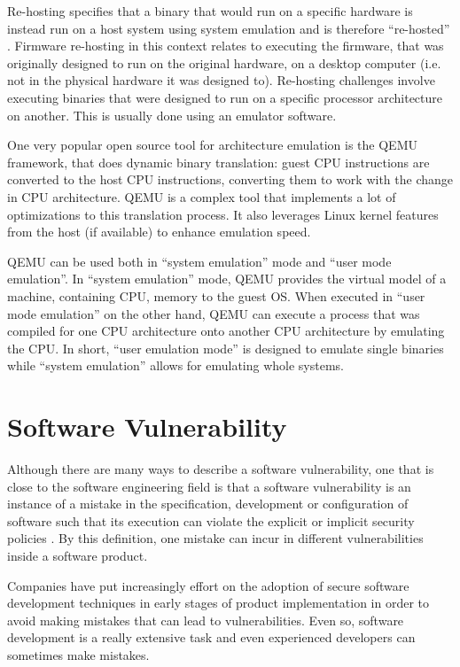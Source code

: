 Re-hosting specifies that a binary that would run on a specific hardware is instead run on a host system using system emulation and is therefore ``re-hosted'' \cite{firmware-challenges}. Firmware re-hosting in this context relates to executing the firmware, that was originally designed to run on the original hardware, on a desktop computer (i.e. not in the physical hardware it was designed to). Re-hosting challenges involve executing binaries that were designed to run on a specific processor architecture on another. This is usually done using an emulator software.

One very popular open source tool for architecture emulation is the QEMU \cite{qemu} framework, that does dynamic binary translation: guest CPU instructions are converted to the host CPU instructions, converting them to work with the change in CPU architecture. QEMU is a complex tool that implements a lot of optimizations to this translation process. It also leverages Linux kernel features from the host (if available) to enhance emulation speed.

QEMU can be used both in ``system emulation'' mode and ``user mode emulation''. In ``system emulation'' mode, QEMU provides the virtual model of a machine, containing CPU, memory to the guest OS. When executed in ``user mode emulation'' on the other hand, QEMU can execute a process that was compiled for one CPU architecture onto another CPU architecture by emulating the CPU. In short, ``user emulation mode'' is designed to emulate single binaries while ``system emulation'' allows for emulating whole systems.

\section{Software Vulnerability}

Although there are many ways to describe a software vulnerability, one that is close to the software engineering field is that a software vulnerability is an instance of a mistake in the specification, development or configuration of software such that its execution can violate the explicit or implicit security policies \cite{vuln-discovery}. By this definition, one mistake can incur in different vulnerabilities inside a software product.

Companies have put increasingly effort on the adoption of secure software development techniques in early stages of product implementation in order to avoid making mistakes that can lead to vulnerabilities. Even so, software development is a really extensive task and even experienced developers can sometimes make mistakes.

